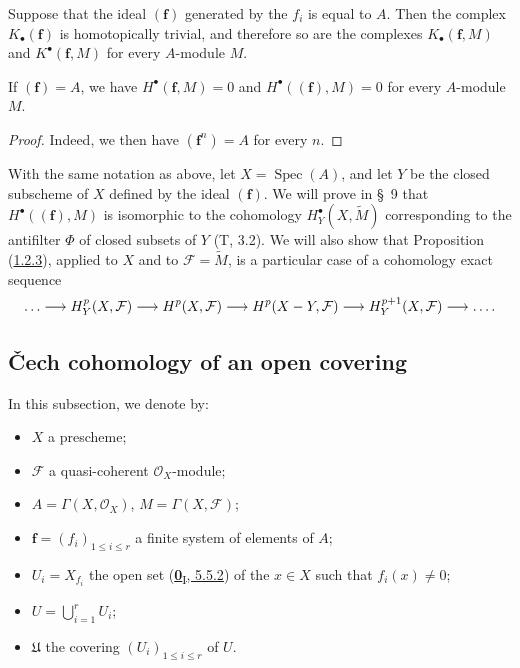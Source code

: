 \begin{proposition}[1.1.8]
\label{III.1.1.8}
Suppose that the ideal $(\mathbf f)$ generated by the $f_i$ is equal to $A$.
Then the complex $K_\bullet(\mathbf f)$ is homotopically trivial, and
therefore so are the complexes $K_\bullet(\mathbf f,M)$ and
$K^\bullet(\mathbf f,M)$ for every $A$-module $M$.
\end{proposition}

\begin{corollary}[1.1.9]
\label{III.1.1.9}
If $(\mathbf f)=A$, we have $H^\bullet(\mathbf f,M)=0$ and
$H^\bullet((\mathbf f),M)=0$ for every $A$-module $M$.
\end{corollary}

\begin{proof}
Indeed, we then have $(\mathbf f^n)=A$ for every $n$.
\end{proof}

\begin{remark}[1.1.10]
\label{III.1.1.10}
With the same notation as above, let $X=\operatorname{Spec}(A)$, and
let $Y$ be the closed subscheme of $X$ defined by the ideal $(\mathbf f)$. We
will prove in \S~9 that $H^\bullet((\mathbf f),M)$ is isomorphic to the
cohomology $H_Y^\bullet(X,\widetilde M)$ corresponding to the antifilter
$\Phi$ of closed subsets of $Y$ (T, 3.2). We will also show that
Proposition (\hyperref[III.1.2.3]{1.2.3}), applied to $X$ and to
$\mathcal F=\widetilde M$, is a particular case of a cohomology exact
sequence
\[
\ldots\longrightarrow H_Y^p(X,\mathcal F)\longrightarrow H^p(X,\mathcal F)
\longrightarrow H^p(X- Y,\mathcal F)\longrightarrow H_Y^{p+1}(X,\mathcal F)
\longrightarrow\ldots.
\]
\end{remark}

\subsection{Čech cohomology of an open covering}
\label{subsection:III.1.2}

\begin{notation}[1.2.1]
\label{III.1.2.1}
In this subsection, we denote by:
\begin{itemize}
\item $X$ a prescheme;
\item $\mathcal F$ a quasi-coherent $\mathcal O_X$-module;
\item $A=\Gamma(X,\mathcal O_X)$, $M=\Gamma(X,\mathcal F)$;
\item $\mathbf f=(f_i)_{1\leq i\leq r}$ a finite system of elements of $A$;
\item $U_i=X_{f_i}$ the open set
(\hyperref[0.5.5.2]{\textbf{0}\textsubscript{I}, 5.5.2}) of the $x\in X$ such that
$f_i(x)\neq0$;
\item $U=\bigcup_{i=1}^r U_i$;
\item $\mathfrak U$ the covering $(U_i)_{1\leq i\leq r}$ of $U$.
\end{itemize}
\end{notation}

